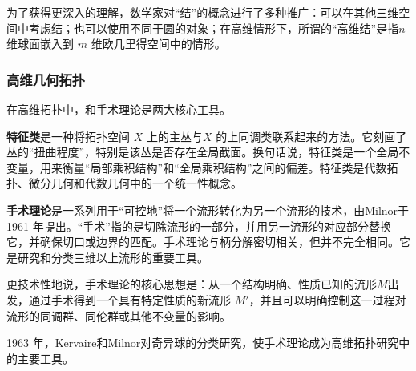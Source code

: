 为了获得更深入的理解，数学家对“结”的概念进行了多种推广：可以在其他三维空间中考虑结；也可以使用不同于圆的对象；在高维情形下，所谓的“高维结”是指$n$ 维球面嵌入到 $m$ 维欧几里得空间中的情形。
\subsubsection{高维几何拓扑}
在高维拓扑中，和手术理论是两大核心工具。

\textbf{特征类}是一种将拓扑空间 $X$ 上的主丛与$X$ 的上同调类联系起来的方法。它刻画了丛的“扭曲程度”，特别是该丛是否存在全局截面。换句话说，特征类是一个全局不变量，用来衡量“局部乘积结构”和“全局乘积结构”之间的偏差。特征类是代数拓扑、微分几何和代数几何中的一个统一性概念。

\textbf{ 手术理论}是一系列用于“可控地”将一个流形转化为另一个流形的技术，由Milnor于 1961 年提出。“手术”指的是切除流形的一部分，并用另一流形的对应部分替换它，并确保切口或边界的匹配。手术理论与柄分解密切相关，但并不完全相同。它是研究和分类三维以上流形的重要工具。

更技术性地说，手术理论的核心思想是：从一个结构明确、性质已知的流形$M$出发，通过手术得到一个具有特定性质的新流形 $M'$，并且可以明确控制这一过程对流形的同调群、同伦群或其他不变量的影响。

1963 年，Kervaire和Milnor对奇异球的分类研究，使手术理论成为高维拓扑研究中的主要工具。
